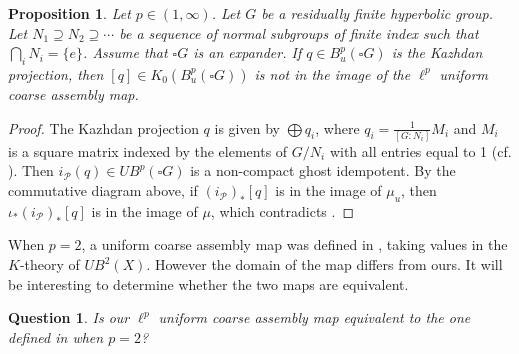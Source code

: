 \documentclass[a4,11pt]{amsart}
\newtheorem{prop}[thm]{Proposition}
\newtheorem{qn}[thm]{Question}
\theoremstyle{remark}
\begin{document}
\begin{prop}
Let $p\in(1,\infty)$. Let $G$ be a residually finite hyperbolic group. Let $N_1\supseteq N_2\supseteq\cdots$ be a sequence of normal subgroups of finite index such that $\bigcap_iN_i=\{e\}$. Assume that $\square G$ is an expander. If $q\in B^p_u(\square G)$ is the Kazhdan projection, then $[q]\in K_0(B^p_u(\square G))$ is not in the image of the $\ell^p$ uniform coarse assembly map.
\end{prop}

\begin{proof}
The Kazhdan projection $q$ is given by $\bigoplus q_i$, where $q_i=\frac{1}{[G:N_i]}M_i$ and $M_i$ is a square matrix indexed by the elements of $G/N_i$ with all entries equal to 1 (cf. \cite[Proof of Theorem 4.3]{Chung23}).
Then $i_\mathcal{P}(q)\in UB^p(\square G)$ is a non-compact ghost idempotent.
By the commutative diagram above, if $(i_\mathcal{P})_*[q]$ is in the image of $\mu_u$, then $\iota_*(i_\mathcal{P})_*[q]$ is in the image of $\mu$, which contradicts \cite[Theorem 5.2]{Chung23}.
\end{proof}

When $p=2$, a uniform coarse assembly map was defined in \cite{Spa09}, taking values in the $K$-theory of $UB^2(X)$. However the domain of the map differs from ours. It will be interesting to determine whether the two maps are equivalent.

\begin{qn}
Is our $\ell^p$ uniform coarse assembly map equivalent to the one defined in \cite{Spa09} when $p=2$?
\end{qn}




\end{document}
